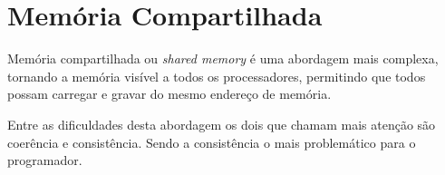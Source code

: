 \section{Memória Compartilhada}

Memória compartilhada ou \textit{shared memory} é uma abordagem mais complexa, 
tornando a memória visível a todos os processadores, permitindo que 
todos possam carregar e gravar do mesmo endereço de memória. 

Entre as dificuldades desta abordagem os dois que chamam mais atenção são
coerência e consistência.
Sendo a consistência o mais problemático para o programador.





